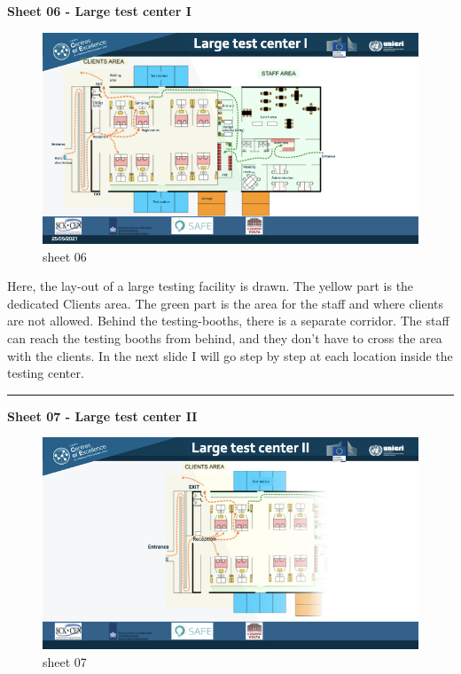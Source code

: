 \documentclass[
]{book}
\begin{document}
\textbf{Sheet 06 - Large test center I}

\begin{figure}
\centering
\includegraphics{images/m05/m05_Workflow_final.006.jpeg}
\caption{sheet 06}
\end{figure}

Here, the lay-out of a large testing facility is drawn. The yellow part
is the dedicated Clients area. The green part is the area for the staff
and where clients are not allowed. Behind the testing-booths, there is a
separate corridor. The staff can reach the testing booths from behind,
and they don't have to cross the area with the clients. In the next
slide I will go step by step at each location inside the testing center.

\begin{center}\rule{0.5\linewidth}{0.5pt}\end{center}

\textbf{Sheet 07 - Large test center II}

\begin{figure}
\centering
\includegraphics{images/m05/m05_Workflow_final.007.jpeg}
\caption{sheet 07}
\end{figure}
\end{document}
